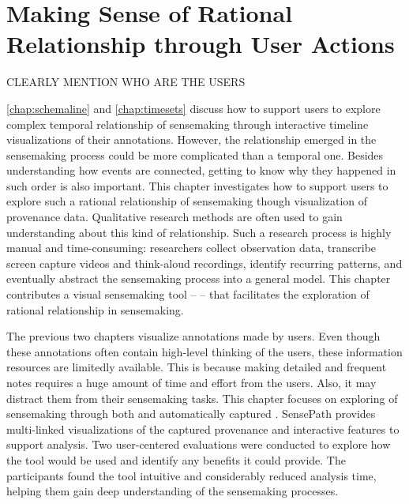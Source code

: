 \chapter{Making Sense of Rational Relationship through User Actions}
\label{chap:sensepath}

\graphicspath{{Chapter5/figures/}}


\pagebreak


CLEARLY MENTION WHO ARE THE USERS





\autoref{chap:schemaline} and \autoref{chap:timesets} discuss how to support users to explore complex temporal relationship of sensemaking through interactive timeline visualizations of their annotations. However, the relationship emerged in the sensemaking process could be more complicated than a temporal one. Besides understanding how events are connected, getting to know why they happened in such order is also important. This chapter investigates how to support users to explore such a rational relationship of sensemaking though visualization of provenance data. Qualitative research methods are often used to gain understanding about this kind of relationship. Such a research process is highly manual and time-consuming: researchers collect observation data, transcribe screen capture videos and think-aloud recordings, identify recurring patterns, and eventually abstract the sensemaking process into a general model. This chapter contributes a visual sensemaking tool -- \emph{} -- that facilitates the exploration of rational relationship in sensemaking. 

The previous two chapters visualize annotations made by users. Even though these annotations often contain high-level thinking of the users, these information resources are limitedly available. This is because making detailed and frequent notes requires a huge amount of time and effort from the users. Also, it may distract them from their sensemaking tasks. This chapter focuses on exploring  of sensemaking through both  and automatically captured . SensePath provides multi-linked visualizations of the captured provenance and interactive features to support analysis. Two user-centered evaluations were conducted to explore how the tool would be used and identify any benefits it could provide. The participants found the tool intuitive and considerably reduced analysis time, helping them gain deep understanding of the sensemaking processes.






